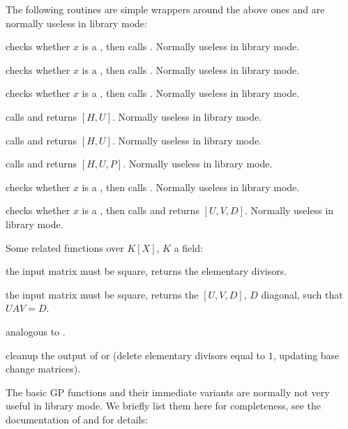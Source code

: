 The following routines are simple wrappers around the above ones and are
normally useless in library mode:

 checks whether $x$ is a , then calls .
Normally useless in library mode.

 checks whether $x$ is a , then calls
. Normally useless in library mode.

 checks whether $x$ is a , then calls
. Normally useless in library mode.

 calls
 and returns $[H, U]$. Normally useless in library
mode.

 calls  and returns $[H,
U]$. Normally useless in library mode.

 calls  and returns
$[H, U, P]$. Normally useless in library mode.

 checks whether $x$ is a , then calls
. Normally useless in library mode.

 checks whether $x$ is a , then calls
 and returns $[U,V,D]$. Normally useless in
library mode.

\noindent Some related functions over $K[X]$, $K$ a field:

 the input matrix must be square, returns the
elementary divisors.

 the input matrix must be square, returns the
$[U,V,D]$, $D$ diagonal, such that $UAV = D$.

 analogous to .

 cleanup the output of  or
 (delete elementary divisors equal to $1$, updating base
change matrices).


The basic GP functions and their immediate variants are normally not very
useful in library mode. We briefly list them here for completeness, see the
documentation of  and  for details:

\item {}

